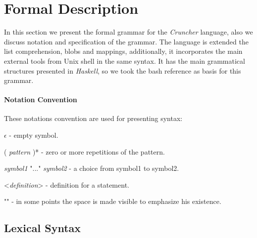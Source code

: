 \documentclass{article}
\begin{document}
\section{Formal Description}
\label{sec:formal}
In this section we present the formal grammar for the \textit{Cruncher}
language, also we discuss notation and specification of the grammar. The
language is extended the list comprehension, blobs and mappings, additionally,
it incorporates the main external tools from Unix shell in the same syntax. It
has the main grammatical structures presented in \textit{Haskell}, so we took
the bash reference \cite{marlow2010haskell} as basis for this grammar.

\paragraph{Notation Convention}
These notations convention are used for presenting syntax:

\begin{grammar}
\item $\epsilon$ - empty symbol.

\item ( \textit{pattern} )* - zero or more repetitions of the pattern.

\item \textit{symbol1} "..." \textit{symbol2} - a choice from symbol1 to symbol2.

\item <\textit{definition}> - definition for a statement.

\item "\textvisiblespace" - in some points the space is made visible to
    emphasize his existence.
\end{grammar}

\subsection{Lexical Syntax}
\end{document}
